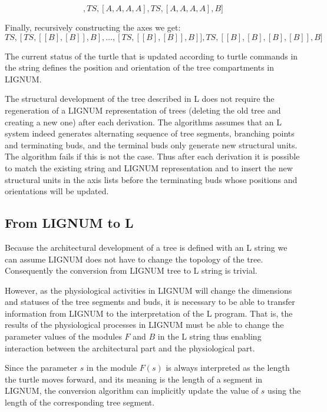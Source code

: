 \begin{equation}
[TS, [], TS, [A,A,A,A], TS, [A,A,A,A], B]
\end{equation}

Finally, recursively constructing the axes we get:
\begin{equation}
[TS, [] TS,[TS,[[B],[B]],B],\ldots, [TS,[[B],[B]],B]], TS, [[B],[B],[B],[B]], B]
\end{equation}

The current status  of the turtle that is  updated according to turtle
commands in  the string  defines the position  and orientation  of the
tree compartments in LIGNUM.

The structural development of the tree described in L does not require
the regeneration of a LIGNUM representation of trees (deleting the old
tree and  creating a new  one) after each derivation.   The algorithms
assumes that an L system indeed generates alternating sequence of tree
segments, branching points and terminating buds, and the terminal buds
only generate  new structural units.   The algorithm fails if  this is
not the case.  Thus after each  derivation it is possible to match the
existing  string  and LIGNUM  representation  and  to  insert the  new
structural units in  the axis lists before the  terminating buds whose
positions and orientations will be updated.


\subsection{From LIGNUM to L}\label{sec:LignumToL}

Because the architectural  development of a tree is  defined with an L
string we  can assume LIGNUM does  not have to change  the topology of
the tree.  Consequently the conversion from LIGNUM tree to L string is
trivial.
  
However,    as     the    physiological    activities     in    LIGNUM
\citep{perttunen:96} will  change the  dimensions and statuses  of the
tree  segments  and buds,  it  is necessary  to  be  able to  transfer
information from LIGNUM to the  interpretation of the L program.  That
is, the results of the  physiological processes in LIGNUM must be able
to change  the parameter values  of the modules  $F$ and $B$ in  the L
string thus  enabling interaction  between the architectural  part and
the physiological part.

Since the parameter $s$ in  the module $F(s)$ is always interpreted as
the length the turtle moves forward,  and its meaning is the length of
a segment  in LIGNUM, the  conversion algorithm can  implicitly update
the value of $s$ using the length of the corresponding tree segment.


